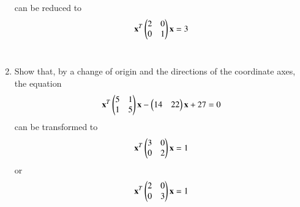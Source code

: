 \begin{enumerate}[label=\arabic*.,ref=\thesubsection.\theenumi]
can be reduced to 
\begin{align}
\mathbf{x}^T\begin{pmatrix}2 & 0\\ 0 & 1\end{pmatrix}\mathbf{x}= 3
\end{align}
\\
\solution

\item Show that, by a change of origin and the directions of the coordinate axes, the equation
\begin{align}
\mathbf{x}^T\begin{pmatrix}5&1\\1&5\end{pmatrix}\mathbf{x}-\begin{pmatrix}14&22\end{pmatrix}\mathbf{x}+27 = 0\label{eq:solutions/3/4/11/eq:0}
\end{align}
can be transformed to
\begin{align}
\mathbf{x}^T\begin{pmatrix}3&0\\0&2\end{pmatrix}\mathbf{x}=1 \label{eq:solutions/3/4/11/eq:0.1}
\end{align}
or
\begin{align}
\mathbf{x}^T\begin{pmatrix}2&0\\0&3\end{pmatrix}\mathbf{x}=1 \label{eq:solutions/3/4/11/eq:0.2}
\end{align}
\solution

\end{enumerate}
